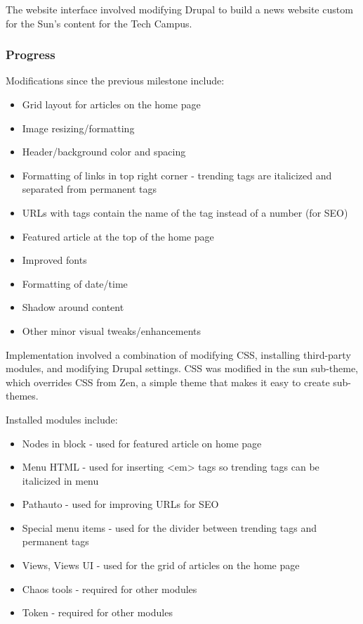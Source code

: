 \documentclass[12pt]{article} %
\begin{document}
The website interface involved modifying Drupal to build a news website custom for the Sun’s content for the Tech Campus.

\subsubsection{Progress}

Modifications since the previous milestone include:

\begin{itemize}
\item Grid layout for articles on the home page
\item Image resizing/formatting
\item Header/background color and spacing
\item Formatting of links in top right corner - trending tags are italicized and separated from permanent tags
\item URLs with tags contain the name of the tag instead of a number (for SEO)
\item Featured article at the top of the home page
\item Improved fonts
\item Formatting of date/time
\item Shadow around content
\item Other minor visual tweaks/enhancements
\end{itemize}

Implementation involved a combination of modifying CSS, installing third-party modules, and modifying Drupal settings. CSS was modified in the sun sub-theme, which overrides CSS from Zen, a simple theme that makes it easy to create sub-themes.

Installed modules include:

\begin{itemize}
\item Nodes in block - used for featured article on home page
\item Menu HTML - used for inserting <em> tags so trending tags can be italicized in menu
\item Pathauto - used for improving URLs for SEO
\item Special menu items - used for the divider between trending tags and permanent tags
\item Views, Views UI - used for the grid of articles on the home page
\item Chaos tools - required for other modules
\item Token - required for other modules
\end{itemize}
\end{document}
